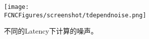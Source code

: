 \begin{figure}[H]
\centering
\texttt{[image: \\FCNCFigures/screenshot/tdependnoise.png]}
\caption{不同的Latency下计算的噪声。}
\label{fig:tdependnoise}
\end{figure}